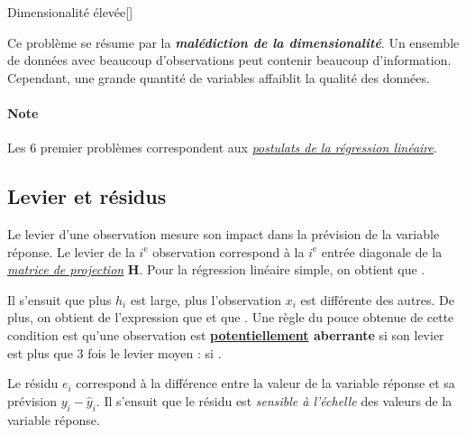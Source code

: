 \documentclass[french]{article}
\begin{document}
\begin{multicols*}{2}
\begin{definitionGENERAL}{\hypertarget{multidimProb}{Dimensionalité élevée}}[]
\bigskip

Ce problème se résume par la \textbf{\textit{malédiction de la dimensionalité}}. Un ensemble de données avec beaucoup d'observations peut contenir beaucoup d'information. Cependant, une grande quantité de variables affaiblit la qualité des données.
\end{definitionGENERAL}


\paragraph{Note}	Les 6 premier problèmes correspondent aux \textit{\color{bleudefrance}\underline{\hyperlink{postulatsSLR}{\color{bleudefrance} postulats de la régression linéaire}}}.



\columnbreak
\subsection{Levier et résidus}\label{subsec:LMHLevRes}
\begin{definitionNOHFILL}
Le levier d'une observation mesure son impact dans la prévision de la variable réponse. Le levier de la $i^{\text{e}}$ observation correspond à la $i^{\text{e}}$ entrée diagonale de la \textit{\color{bleudefrance}\underline{\hyperlink{hatMatrix}{\color{bleudefrance} matrice de projection}}} $\bm{H}$. Pour la régression linéaire simple, on obtient que .

\bigskip

Il s'ensuit que plus $h_{i}$ est large, plus l'observation $x_{i}$ est différente des autres. De plus, on obtient de l'expression que  et que . Une règle du pouce obtenue de cette condition est qu'une observation est \textbf{\underline{potentiellement} aberrante} si son levier est plus que 3 fois le levier moyen :  si .
\end{definitionNOHFILL}

\bigskip

\begin{rappel_enhanced}[Contexte]
Le résidu $e_{i}$ correspond à la différence entre la valeur de la variable réponse et sa prévision $y_{i} - \hat{y}_{i}$. Il s'ensuit que le résidu est \textit{sensible à l'échelle} des valeurs de la variable réponse. 


\end{rappel_enhanced}
\end{multicols*}
\end{document}
